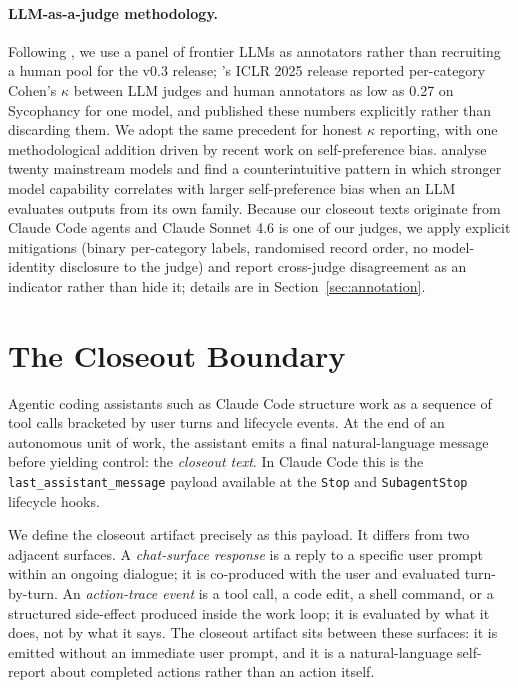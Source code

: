 \documentclass{safeai2026}
\begin{document}
\paragraph{LLM-as-a-judge methodology.}
Following \citet{darkbench2025}, we use a panel of frontier LLMs as annotators rather than recruiting a human pool for the v0.3 release; \citeauthor{darkbench2025}'s ICLR 2025 release reported per-category Cohen's $\kappa$ between LLM judges and human annotators as low as 0.27 on Sycophancy for one model, and published these numbers explicitly rather than discarding them.
We adopt the same precedent for honest $\kappa$ reporting, with one methodological addition driven by recent work on self-preference bias.
\citet{spb2026} analyse twenty mainstream models and find a counterintuitive pattern in which stronger model capability correlates with larger self-preference bias when an LLM evaluates outputs from its own family.
Because our closeout texts originate from Claude Code agents and Claude Sonnet 4.6 is one of our judges, we apply explicit mitigations (binary per-category labels, randomised record order, no model-identity disclosure to the judge) and report cross-judge disagreement as an indicator rather than hide it; details are in Section~\ref{sec:annotation}.

\section{The Closeout Boundary}\label{sec:boundary}

Agentic coding assistants such as Claude Code structure work as a sequence of tool calls bracketed by user turns and lifecycle events.
At the end of an autonomous unit of work, the assistant emits a final natural-language message before yielding control: the \emph{closeout text}.
In Claude Code this is the \texttt{last\_assistant\_message} payload available at the \texttt{Stop} and \texttt{SubagentStop} lifecycle hooks.

We define the closeout artifact precisely as this payload.
It differs from two adjacent surfaces.
A \emph{chat-surface response} is a reply to a specific user prompt within an ongoing dialogue; it is co-produced with the user and evaluated turn-by-turn.
An \emph{action-trace event} is a tool call, a code edit, a shell command, or a structured side-effect produced inside the work loop; it is evaluated by what it does, not by what it says.
The closeout artifact sits between these surfaces: it is emitted without an immediate user prompt, and it is a natural-language self-report about completed actions rather than an action itself.
\end{document}
